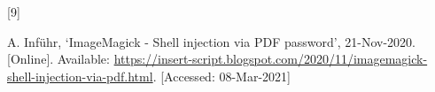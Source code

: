 \documentclass[
  12pt,
  british,
  a4paper,
  rgb,
  dvipsnames,
  svgnames,
  hyphens]{article}
\newlength{\cslhangindent}
\newlength{\csllabelwidth}
\newenvironment{CSLReferences}[2] %
 {%
  \setlength{\parindent}{0pt}
  \ifodd #1 \everypar{\setlength{\hangindent}{\cslhangindent}}\ignorespaces\fi
  \ifnum #2 > 0
  \setlength{\parskip}{#2\baselineskip}
  \fi
 }%
 {}
\newcommand{\CSLLeftMargin}[1]{\parbox[t]{\csllabelwidth}{#1}}
\newcommand{\CSLRightInline}[1]{\parbox[t]{\linewidth - \csllabelwidth}{#1}\break}
\begin{document}
\begin{CSLReferences}{0}{0}
\leavevmode{}%
\CSLLeftMargin{{[}9{]} }
\CSLRightInline{A. Inführ, {`{ImageMagick - Shell injection via PDF
password}'}, 21-Nov-2020. {[}Online{]}. Available:
\url{https://insert-script.blogspot.com/2020/11/imagemagick-shell-injection-via-pdf.html}.
{[}Accessed: 08-Mar-2021{]}}

\end{CSLReferences}
\end{document}
